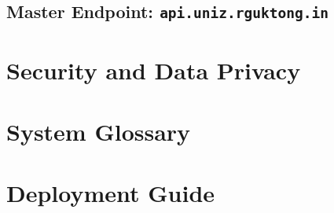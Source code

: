 \documentclass[12pt,a4paper,oneside]{book}
\begin{document}
\section{Master Endpoint: \texttt{api.uniz.rguktong.in}}





\chapter{Security and Data Privacy}


\appendix
\chapter{System Glossary}
\chapter{Deployment Guide}
\end{document}
